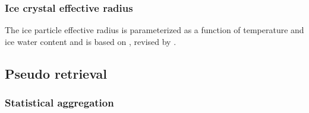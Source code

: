 \subsubsection{Ice crystal effective radius}
The ice particle effective radius is parameterized as a function of 
temperature and ice water content and is based on \citet{Sun1999}, 
revised by \citet{Sun2001}.


\subsection{Pseudo retrieval}
\subsubsection{Statistical aggregation}

%
%
%
%
